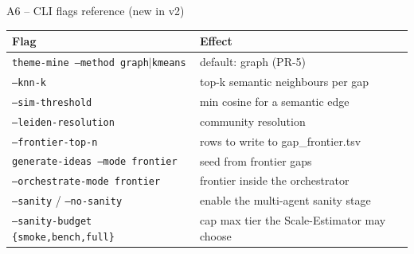 \documentclass[10pt,aspectratio=169]{beamer}
\newcommand{\flag}[1]{\texttt{\small#1}}
\begin{document}
\begin{frame}{A6 -- CLI flags reference (new in v2)}
  \scriptsize
  \begin{tabular}{@{}p{5.6cm} p{6.5cm}@{}}
    \toprule
    Flag & Effect \\
    \midrule
    \flag{theme-mine --method graph$|$kmeans}        & default: graph (PR-5) \\
    \flag{--knn-k}                                    & top-k semantic neighbours per gap \\
    \flag{--sim-threshold}                            & min cosine for a semantic edge \\
    \flag{--leiden-resolution}                        & community resolution \\
    \flag{--frontier-top-n}                           & rows to write to gap\_frontier.tsv \\
    \midrule
    \flag{generate-ideas --mode frontier}             & seed from frontier gaps \\
    \flag{--orchestrate-mode frontier}                & frontier inside the orchestrator \\
    \flag{--sanity} / \flag{--no-sanity}              & enable the multi-agent sanity stage \\
    \flag{--sanity-budget \{smoke,bench,full\}}       & cap max tier the Scale-Estimator may choose \\
    \bottomrule
  \end{tabular}
\end{frame}
\end{document}
